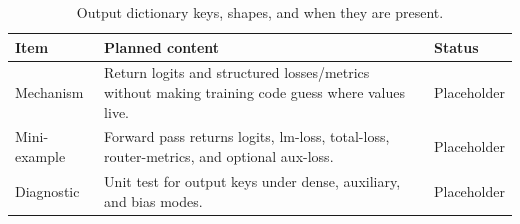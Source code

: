 \begin{table}[H]
\centering
\caption{Output dictionary keys, shapes, and when they are present.}
\label{tab:ch10-forward-pass-outputs-and-loss-dictionary}
\begin{tabularx}{\textwidth}{p{}X p{}}
\toprule
Item & Planned content & Status \\
\midrule
Mechanism & Return logits and structured losses/metrics without making training code guess where values live. & Placeholder \\
Mini-example & Forward pass returns logits, lm-loss, total-loss, router-metrics, and optional aux-loss. & Placeholder \\
Diagnostic & Unit test for output keys under dense, auxiliary, and bias modes. & Placeholder \\
\bottomrule
\end{tabularx}
\end{table}

